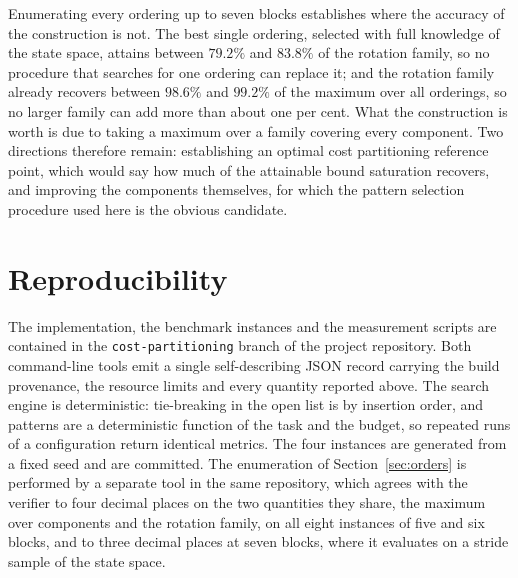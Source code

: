 \documentclass[10pt,twocolumn,a4paper]{article}
\theoremstyle{plain}
\theoremstyle{definition}
\theoremstyle{remark}
\newcommand{\code}[1]{\texttt{#1}}
\begin{document}
Enumerating every ordering up to seven blocks establishes
where the accuracy of the construction is not. The best single ordering,
selected with full knowledge of the state space, attains between $79.2\%$ and
$83.8\%$ of the rotation family, so no procedure that searches for one ordering
can replace it; and the rotation family already recovers between $98.6\%$ and
$99.2\%$ of the maximum over all orderings, so no larger family can add more
than about one per cent. What the construction is worth is due to taking a maximum over a family
covering every component. Two directions therefore remain: establishing an
optimal cost partitioning reference point, which would say how much of the
attainable bound saturation recovers, and improving the components themselves,
for which the pattern selection procedure used here is the obvious candidate.

\section*{Reproducibility}

The implementation, the benchmark instances and the measurement scripts are
contained in the \code{cost-partitioning} branch of the project repository.
Both command-line tools emit a single self-describing JSON record carrying the
build provenance, the resource limits and every quantity reported above. The
search engine is deterministic: tie-breaking in the open list is by insertion
order, and patterns are a deterministic function of the task and the budget, so
repeated runs of a configuration return identical metrics. The four instances
are generated from a fixed seed and are committed. The enumeration of
Section~\ref{sec:orders} is performed by a separate tool in the same
repository, which agrees with the verifier to four decimal places on the two
quantities they share, the maximum over components and the rotation family, on
all eight instances of five and six blocks, and to three decimal places at
seven blocks, where it evaluates on a stride sample of the state space.
\end{document}

